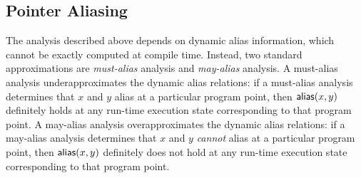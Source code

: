 

\subsection{Pointer Aliasing}

The analysis described above depends on dynamic alias
information, which cannot be exactly computed at compile time.
Instead, two standard approximations are {\em must-alias} analysis and
{\em may-alias} analysis.  A must-alias analysis underapproximates the
dynamic alias relations:  if a must-alias analysis determines that $x$
and $y$ alias at a particular program point, then ${\mathsf{alias}}(x,y)$
definitely holds at any run-time execution state corresponding to that
program point.  A may-alias analysis overapproximates the dynamic
alias relations:  if a may-alias analysis determines that $x$ and $y$
{\em cannot} alias at a particular program point, then ${\mathsf{alias}}(x,y)$
definitely does not hold at any run-time execution state corresponding
to that program point.

